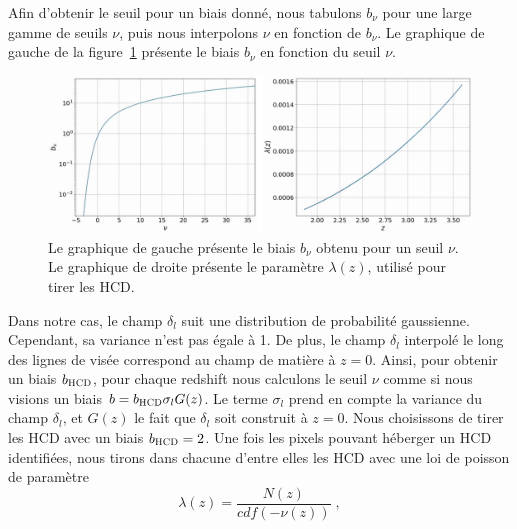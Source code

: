 Afin d'obtenir le seuil pour un biais donné, nous tabulons $b_{\nu}$ pour une large gamme de seuils $\nu$, puis nous interpolons  $\nu$ en fonction de $b_{\nu}$.
  Le graphique de gauche de la figure~\ref{fig:bnu_lambda} présente le biais $b_{\nu}$ en fonction du seuil $\nu$.
\begin{figure}
  \centering
  \includegraphics[scale=0.42]{bnu_lambda}
  \caption{Le graphique de gauche présente le biais $b_{\nu}$ obtenu pour un seuil $\nu$. Le graphique de droite présente le paramètre $\lambda(z)$, utilisé pour tirer les HCD.}
  \label{fig:bnu_lambda}
\end{figure}
Dans notre cas, le champ $\delta_l$ suit une distribution de probabilité gaussienne. Cependant, sa variance n'est pas égale à 1. De plus, le champ $\delta_l$ interpolé le long des lignes de visée correspond au champ de matière à $z=0$. Ainsi, pour obtenir un biais $b_{\textsc{HCD}}$, pour chaque redshift nous  calculons le seuil $\nu$ comme si nous visions un biais $b = b_{\textsc{HCD}} \sigma_l G(z)$. Le terme $\sigma_l$ prend en compte la variance du champ $\delta_l$, et $G(z)$ le fait que $\delta_l$ soit construit à $z=0$. Nous choisissons de tirer les HCD avec un biais $b_{\textsc{HCD}} = 2$.
Une fois les pixels pouvant héberger un HCD identifiées, nous tirons dans chacune d'entre elles les HCD avec une loi de poisson de paramètre
\begin{equation}
  \lambda(z) = \frac{N(z)}{cdf(-\nu(z))} \; ,
\end{equation}
